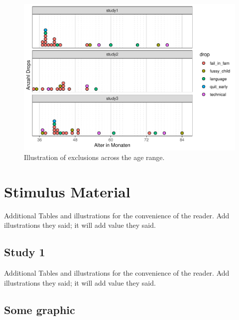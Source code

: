 \documentclass[
  man]{apa6}
\begin{document}
\begin{figure}

{\centering \includegraphics{symlit_rep_manuscript_files/figure-latex/suppl-drops-dots-1} 

}

\caption{Illustration of exclusions across the age range.}\label{fig:suppl-drops-dots}
\end{figure}

\section{Stimulus Material}\label{stimulus-material}

Additional Tables and illustrations for the convenience of the reader. Add illustrations they said; it will add value they said.

\subsection{Study 1}\label{study-1-1}

Additional Tables and illustrations for the convenience of the reader. Add illustrations they said; it will add value they said.

\subsection{Some graphic}\label{some-graphic}
\end{document}
